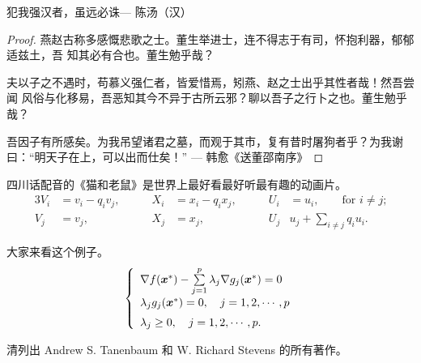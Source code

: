 \begin{theorem}
    \label{thm-theorem-example}
    犯我强汉者，虽远必诛\hfill --- 陈汤（汉）
\end{theorem}

\begin{proof}
    \label{thm-proof-example}
    燕赵古称多感慨悲歌之士。董生举进士，连不得志于有司，怀抱利器，郁郁适兹土，吾
    知其必有合也。董生勉乎哉？

    夫以子之不遇时，苟慕义强仁者，皆爱惜焉，矧燕、赵之士出乎其性者哉！然吾尝闻
    风俗与化移易，吾恶知其今不异于古所云邪？聊以吾子之行卜之也。董生勉乎哉？

    吾因子有所感矣。为我吊望诸君之墓，而观于其市，复有昔时屠狗者乎？为我谢
    曰：“明天子在上，可以出而仕矣！” \hfill --- 韩愈《送董邵南序》
\end{proof}

\begin{corollary}
    \label{thm-corollary-example}
    四川话配音的《猫和老鼠》是世界上最好看最好听最有趣的动画片。
    \begin{alignat}{3}
        V_i & =v_i - q_i v_j, & \qquad X_i & = x_i - q_i x_j, &
        \qquad U_i & = u_i, \qquad \text{for $i\ne j$;} \\
        V_j & = v_j,          & \qquad X_j & = x_j, &
        \qquad U_j & u_j + \sum_{i\ne j} q_i u_i.
    \end{alignat}
\end{corollary}

\begin{example}
    \label{thm-example-example}
    大家来看这个例子。
    \begin{equation}
        \left\{
        \begin{array}{l}
            \nabla f({\mbox{\boldmath $x$}}^*)-
                \sum\limits_{j=1}^p\lambda_j\nabla g_j
                ({\mbox{\boldmath $x$}}^*)=0 \\ [0.3cm]
            \lambda_jg_j({\mbox{\boldmath $x$}}^*)=0,
                \quad j=1,2,\cdots,p \\ [0.2cm]
            \lambda_j\ge 0,\quad j=1,2,\cdots,p.
        \end{array}
        \right.
    \end{equation}
\end{example}

\begin{exercise}
    \label{thm-exercise-example}
    清列出 Andrew S. Tanenbaum 和 W. Richard Stevens 的所有著作。
\end{exercise}

